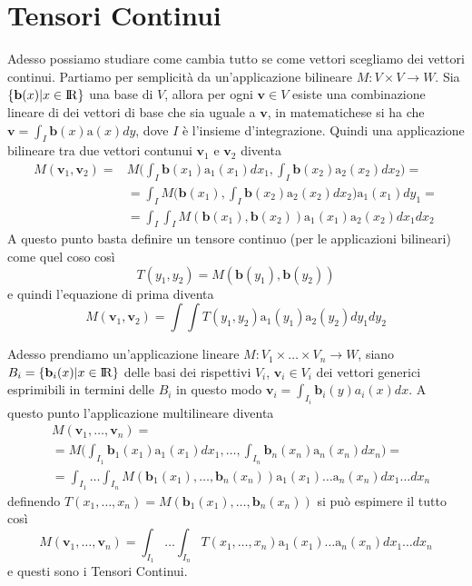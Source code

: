 \documentclass[11pt,a4paper]{report}
\newcommand{\vettore}[1]{\mathbf{#1}}
\newcommand{\vettorec}[1]{\textrm{#1}}
\theoremstyle{definition}
\theoremstyle{plain}
\theoremstyle{plain}
\begin{document}
		\section{Tensori Continui}
			Adesso possiamo studiare come cambia tutto se come vettori scegliamo dei vettori continui.\newline
			Partiamo per semplicità da un'applicazione bilineare $M:V\times V\rightarrow W$.
			Sia $\{\vettore b(x)|x \in \rm I\!R\}$ una base di $V$, allora per ogni $\vettore v\in V$ esiste una combinazione lineare di dei vettori di base che sia uguale a $\vettore v$, in matematichese si ha che $\vettore v=\int_I \vettore b(x)\vettorec a(x)dy$, dove $I$ è l'insieme d'integrazione. Quindi una applicazione bilineare tra due vettori contunui $\vettore v_1$ e $\vettore v_2$ diventa
			\begin{equation}
			\begin{split}
				M(\vettore v_1,\vettore v_2)=& M\bigg(\int_I \vettore b(x_1)\vettorec a_1(x_1)dx_1,\int_I \vettore b(x_2)\vettorec a_2(x_2)dx_2\bigg)=\\
				& =\int_I M\bigg(\vettore b(x_1),\int_I \vettore b(x_2)\vettorec a_2(x_2)dx_2\bigg)\vettorec a_1(x_1)dy_1=\\
				&=\int_I \int_I M(\vettore b(x_1),\vettore b(x_2))\vettorec a_1(x_1)\vettorec a_2(x_2)dx_1dx_2
			\end{split}
			\end{equation}
			A questo punto basta definire un tensore continuo (per le applicazioni bilineari) come quel coso così
			\[
				T(y_1,y_2)=M(\vettore b(y_1),\vettore b(y_2))
			\]
			e quindi l'equazione di prima diventa
			\[
				M(\vettore v_1,\vettore v_2)=\int \int T(y_1,y_2)\vettorec a_1(y_1)\vettorec a_2(y_2)dy_1dy_2
			\]
			\newline

			Adesso prendiamo un'applicazione lineare $M:V_1\times\dots\times V_n\rightarrow W$, siano $B_i=\{\vettore b_i(x)|x\in \rm I \! R\}$ delle basi dei rispettivi $V_i$, $\vettore v_i \in V_i$ dei vettori generici esprimibili in termini delle $B_i$ in questo modo $\vettore v_i=\int_{I_i} \vettore b_i(y)a_i(x)dx$.
			A questo punto l'applicazione multilineare diventa
			\begin{equation}
			\begin{split}
				& M(\vettore v_1,\dots,\vettore v_n)=\\
				&=M\bigg(\int_{I_1} \vettore b_1(x_1)\vettorec a_1(x_1)dx_1,\dots,\int_{I_n} \vettore b_n(x_n)\vettorec a_n(x_n)dx_n\bigg)=\\
				&=\int_{I_1}\dots\int_{I_n}M(\vettore b_1(x_1),\dots,\vettore b_n(x_n))
				\vettorec a_1(x_1)\dots\vettorec a_n(x_n)dx_1\dots dx_n
			\end{split}
			\end{equation}
			definendo $T(x_1,\dots,x_n)=M(\vettore b_1(x_1),\dots,\vettore b_n(x_n))$ si può espimere il tutto così
			\begin{equation}
			\label{eq:prod_vett_tens}
				M(\vettore v_1,\dots,\vettore v_n)=\int_{I_1}\dots\int_{I_n}T(x_1,\dots,x_n)
				\vettorec a_1(x_1)\dots\vettorec a_n(x_n)dx_1\dots dx_n
			\end{equation}
			e questi sono i Tensori Continui.
\end{document}
